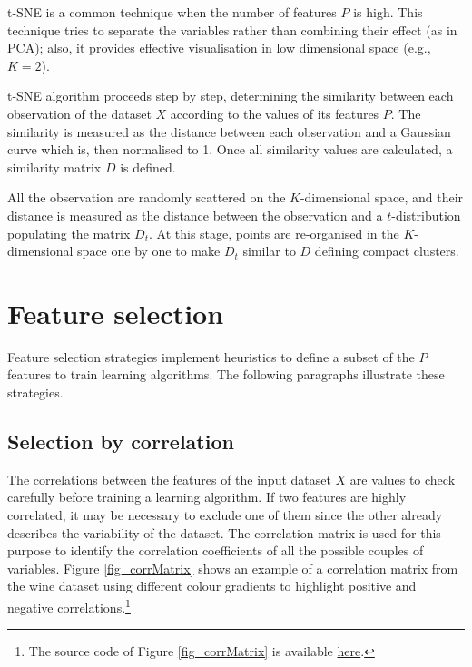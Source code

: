 t-SNE is a common technique when the number of features $P$ is high. This technique tries to separate the variables rather than combining their effect (as in PCA); also, it provides effective visualisation in low dimensional space (e.g., $K=2$).\par

t-SNE algorithm proceeds step by step, determining the similarity between each observation of the dataset $X$ according to the values of its features $P$. The similarity is measured as the distance between each observation and a Gaussian curve which is, then normalised to 1. Once all similarity values are calculated, a similarity matrix $D$ is defined.\par

All the observation are randomly scattered on the $K$-dimensional space, and their distance is measured as the distance between the observation and a $t$-distribution populating the matrix $D_t$. At this stage, points are re-organised in the $K$-dimensional space one by one to make $D_t$ similar to $D$ defining compact clusters.

\section{Feature selection}
Feature selection strategies implement heuristics to define a subset of the $P$ features to train learning algorithms. The following paragraphs illustrate these strategies.

\subsection{Selection by correlation}
The correlations between the features of the input dataset $X$ are values to check carefully before training a learning algorithm. If two features are highly correlated, it may be necessary to exclude one of them since the other already describes the variability of the dataset. The correlation matrix is used for this purpose to identify the correlation coefficients of all the possible couples of variables. Figure \ref{fig_corrMatrix} shows an example of a correlation matrix from the wine dataset using different colour gradients to highlight positive and negative correlations.\footnote{The source code of Figure \ref{fig_corrMatrix} is available \href{https://github.com/aletuf93/logproj/blob/master/examples/05.\%20Dimensionality\%20Reduction.ipynb}{here}.}


